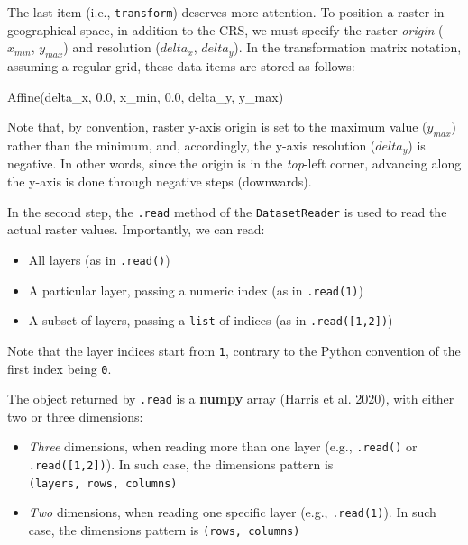 \documentclass[
  letterpaper,
]{krantz}
\newenvironment{Shaded}{\begin{snugshade}}{\end{snugshade}}
\newcommand{\NormalTok}[1]{\textcolor[rgb]{0.00,0.23,0.31}{#1}}
\providecommand{\tightlist}{%
  \setlength{\itemsep}{0pt}\setlength{\parskip}{0pt}}\usepackage{longtable,booktabs,array}
\begin{document}
The last item (i.e., \texttt{transform}) deserves more attention. To
position a raster in geographical space, in addition to the CRS, we must
specify the raster \emph{origin} (\(x_{min}\), \(y_{max}\)) and
resolution (\(delta_{x}\), \(delta_{y}\)). In the transformation matrix
notation, assuming a regular grid, these data items are stored as
follows:

\begin{Shaded}
\begin{Highlighting}[]
\NormalTok{Affine(delta\_x, 0.0, x\_min,}
\NormalTok{       0.0, delta\_y, y\_max)}
\end{Highlighting}
\end{Shaded}

Note that, by convention, raster y-axis origin is set to the maximum
value (\(y_{max}\)) rather than the minimum, and, accordingly, the
y-axis resolution (\(delta_{y}\)) is negative. In other words, since the
origin is in the \emph{top}-left corner, advancing along the y-axis is
done through negative steps (downwards).

In the second step, the \texttt{.read} method of the
\texttt{DatasetReader} is used to read the actual raster values.
Importantly, we can read:

\begin{itemize}
\tightlist
\item
  All layers (as in \texttt{.read()})
\item
  A particular layer, passing a numeric index (as in \texttt{.read(1)})
\item
  A subset of layers, passing a \texttt{list} of indices (as in
  \texttt{.read({[}1,2{]})})
\end{itemize}

Note that the layer indices start from \texttt{1}, contrary to the
Python convention of the first index being \texttt{0}.

The object returned by \texttt{.read} is a \textbf{numpy} array (Harris
et al. 2020), with either two or three dimensions:

\begin{itemize}
\tightlist
\item
  \emph{Three} dimensions, when reading more than one layer (e.g.,
  \texttt{.read()} or \texttt{.read({[}1,2{]})}). In such case, the
  dimensions pattern is \texttt{(layers,\ rows,\ columns)}
\item
  \emph{Two} dimensions, when reading one specific layer (e.g.,
  \texttt{.read(1)}). In such case, the dimensions pattern is
  \texttt{(rows,\ columns)}
\end{itemize}
\end{document}
